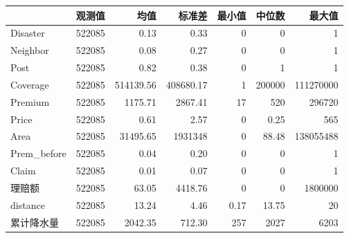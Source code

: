 \begin{tabular}{lrrrrrr}
\toprule
 & 观测值 & 均值 & 标准差 & 最小值 & 中位数 & 最大值 \\
\midrule
Disaster & 522085 & 0.13 & 0.33 & 0 & 0 & 1 \\
Neighbor & 522085 & 0.08 & 0.27 & 0 & 0 & 1 \\
Post & 522085 & 0.82 & 0.38 & 0 & 1 & 1 \\
Coverage & 522085 & 514139.56 & 408680.17 & 1 & 200000 & 111270000 \\
Premium & 522085 & 1175.71 & 2867.41 & 17 & 520 & 296720 \\
Price & 522085 & 0.61 & 2.57 & 0 & 0.25 & 565 \\
Area & 522085 & 31495.65 & 1931348 & 0 & 88.48 & 138055488 \\
Prem\_before & 522085 & 0.04 & 0.20 & 0 & 0 & 1 \\
Claim & 522085 & 0.01 & 0.07 & 0 & 0 & 1 \\
理赔额 & 522085 & 63.05 & 4418.76 & 0 & 0 & 1800000 \\
distance & 522085 & 13.24 & 4.46 & 0.17 & 13.75 & 20 \\
累计降水量 & 522085 & 2042.35 & 712.30 & 257 & 2027 & 6203 \\
\bottomrule
\end{tabular}
